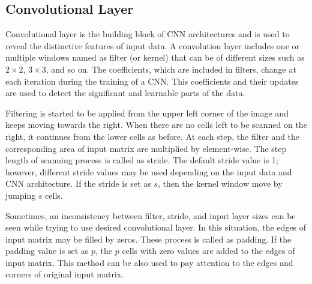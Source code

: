 \subsection{Convolutional Layer}

Convolutional layer is the building block of CNN architectures and is used to reveal the distinctive features of input data. A convolution layer includes one or multiple windows named as filter (or kernel) that can be of different sizes such as $2 \times 2$, $3\times3$, and so on. The coefficients, which are included in filters, change at each iteration during the training of a CNN. This coefficients and their updates are used to detect the significant and learnable parts of the data.

Filtering is started to be applied from the upper left corner of the image and keeps moving towards the right. When there are no cells left to be scanned on the right, it continues from the lower cells as before. At each step, the filter and the corresponding area of input matrix are multiplied by element-wise. The step length of scanning process is called as stride. The default stride value is 1; however, different stride values may be used depending on the input data and CNN architecture. If the stride is set as $s$, then the kernel window move by jumping $s$ cells. 

Sometimes, an inconsistency between filter, stride, and input layer sizes can be seen while trying to use desired convolutional layer. In this situation, the edges of input matrix may be filled by zeros. These process is called as padding. If the padding value is set as $p$, the $p$ cells with zero values are added to the edges of input matrix. This method can be also used to pay attention to the edges and corners of original input matrix.

